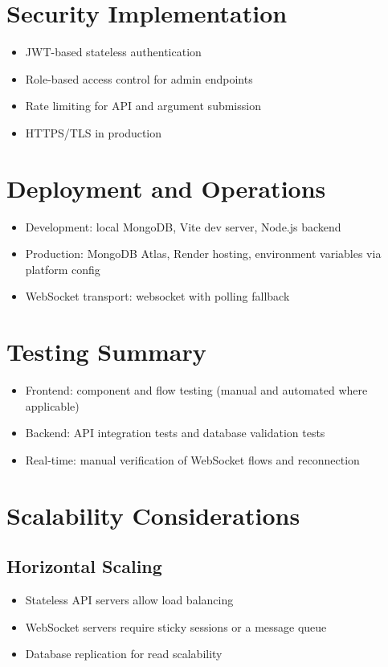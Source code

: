 \section{Security Implementation}

\begin{itemize}
    \item JWT-based stateless authentication
    \item Role-based access control for admin endpoints
    \item Rate limiting for API and argument submission
    \item HTTPS/TLS in production
\end{itemize}

\section{Deployment and Operations}

\begin{itemize}
    \item Development: local MongoDB, Vite dev server, Node.js backend
    \item Production: MongoDB Atlas, Render hosting, environment variables via platform config
    \item WebSocket transport: websocket with polling fallback
\end{itemize}

\section{Testing Summary}

\begin{itemize}
    \item Frontend: component and flow testing (manual and automated where applicable)
    \item Backend: API integration tests and database validation tests
    \item Real-time: manual verification of WebSocket flows and reconnection
\end{itemize}

\section{Scalability Considerations}

\subsection{Horizontal Scaling}
\begin{itemize}
    \item Stateless API servers allow load balancing
    \item WebSocket servers require sticky sessions or a message queue
    \item Database replication for read scalability
\end{itemize}

